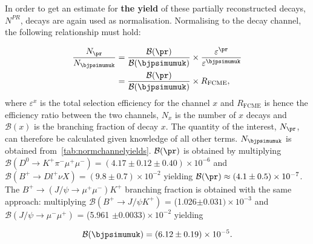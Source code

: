 In order to get an estimate for \textbf{the yield} of these partially reconstructed decays, $N^{PR}$, \bjpsimumuk decays are again used as normalisation. Normalising to the \bjpsimumuk decay channel, the following relationship must hold: 

\begin{equation}
\begin{split}
\frac{N_{\pr}}{N_{\bjpsimumuk}}&= \frac{\mathcal{B}(\pr)}{\mathcal{B}(\bjpsimumuk)} \times \frac{\varepsilon^{\pr}}{\varepsilon^{\bjpsimumuk}} \\
&=\frac{\mathcal{B}(\pr)}{\mathcal{B}(\bjpsimumuk)} \times R_{\mathrm{FCME}},
\end{split}
\end{equation}
	where $\varepsilon^{x}$ is the total selection efficiency for the channel $x$ and $R_{\mathrm{FCME}}$ is hence the efficiency ratio between the two channels, $N_{x}$ is the number of $x$ decays and $\mathcal{B}(x)$ is the branching fraction of decay $x$. The quantity of the interest, $N_{\pr}$, can therefore be calculated given knowledge of all other terms. $N_{\bjpsimumuk}$ is obtained from~\autoref{tab:normchannelyields}. $\mathcal{B}(\pr)$ is obtained by multiplying $\mathcal{B}(D^{0} \rightarrow K^+ \pi^- \mu^+ \mu^{-}) = (4.17\pm0.12\pm0.40)\times 10^{-6}$\cite{Aaij:2015hva} and $\mathcal{B}(B^{+} \rightarrow D l^{+} \nu X) = (9.8 \pm 0.7)\times 10^{-2}$ \cite{Patrignani:2016xqp} yielding $\mathcal{B}(\pr) \approx (4.1\pm0.5)\times 10 ^{-7 }$. The $B^+ \rightarrow (J/\psi \rightarrow \mu^+ \mu^{-}) K^{+}$ branching fraction is obtained with the same approach: multiplying $\mathcal{B}(B^{+} \rightarrow J/\psi K^{+})$ = (1.026$\pm 0.031)\times 10^{-3}$\cite{Patrignani:2016xqp} and $\mathcal{B}(J/\psi \rightarrow \mu^{-} \mu^{+})$ = (5.961 $\pm0.0033) \times 10^{-2}$\cite{Patrignani:2016xqp} yielding 
	
\begin{equation}
\mathcal{B}(\bjpsimumuk)=(6.12\pm0.19)\times 10^{-5}.
	\label{eq:normeq}
\end{equation}



